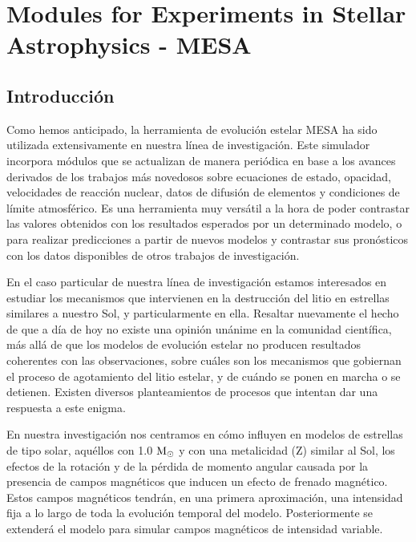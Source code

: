 
\chapter{Modules for Experiments in Stellar Astrophysics - MESA}\label{ch:cuarto-capitulo}
\section{Introducción}
Como hemos anticipado, la herramienta de evolución estelar MESA ha sido utilizada extensivamente en nuestra línea de investigación. Este simulador incorpora módulos que se actualizan de manera periódica en base a los avances derivados de los trabajos más novedosos sobre ecuaciones de estado, opacidad, velocidades de reacción nuclear, datos de difusión de elementos y condiciones de límite atmosférico. Es una herramienta muy versátil a la hora de poder contrastar las valores obtenidos con los resultados esperados por un determinado modelo, o para realizar predicciones a partir de nuevos modelos y contrastar sus pronósticos con los datos disponibles de otros trabajos de investigación.\par

En el caso particular de nuestra línea de investigación estamos interesados en estudiar los mecanismos que intervienen en la destrucción del litio en estrellas similares a nuestro Sol, y particularmente en ella. Resaltar nuevamente el hecho de que a día de hoy no existe una opinión unánime en la comunidad científica, más allá de que los modelos de evolución estelar no producen resultados coherentes con las observaciones, sobre cuáles son los mecanismos que gobiernan el proceso de agotamiento del litio estelar, y de cuándo se ponen en marcha o se detienen. Existen diversos planteamientos de procesos que intentan dar una respuesta a este enigma.\par 

En nuestra investigación nos centramos en cómo influyen en modelos de estrellas de tipo solar, aquéllos con 1.0 $\mathrm{M}_\odot$ y con una metalicidad (Z) similar al Sol, los efectos de la rotación y de la pérdida de momento angular causada por la presencia de campos magnéticos que inducen un efecto de frenado magnético. Estos campos magnéticos tendrán, en una primera aproximación, una intensidad fija a lo largo de toda la evolución temporal del modelo. Posteriormente se extenderá el modelo para simular campos magnéticos de intensidad variable.\par

